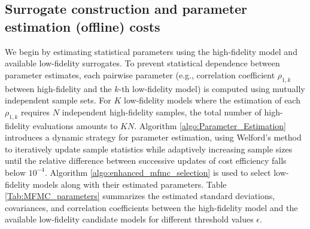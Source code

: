 \subsection{Surrogate construction and parameter estimation (offline) costs}
We begin by estimating statistical parameters using the high-fidelity model and available low-fidelity surrogates. To prevent statistical dependence between parameter estimates, each pairwise parameter (e.g., correlation coefficient $\rho_{1,k}$ between high-fidelity and the $k$-th low-fidelity model) is computed using mutually independent sample sets. For $K$ low-fidelity models where the estimation of each $\rho_{1,k}$ requires $N$ independent high-fidelity samples, the total number of high-fidelity evaluations amounts to $KN$. Algorithm \ref{algo:Parameter_Estimation} introduces a dynamic strategy for parameter estimation, using Welford’s method to iteratively update sample statistics while adaptively increasing sample sizes until the relative difference between successive updates of cost efficiency falls below $10^{-4}$. Algorithm \ref{algo:enhanced_mfmc_selection} is used to select low-fidelity models along with their estimated parameters. Table \ref{Tab:MFMC_parameters} summarizes the estimated standard deviations, covariances, and correlation coefficients between the high-fidelity model and the available low-fidelity candidate models for different threshold values $\epsilon$. 




